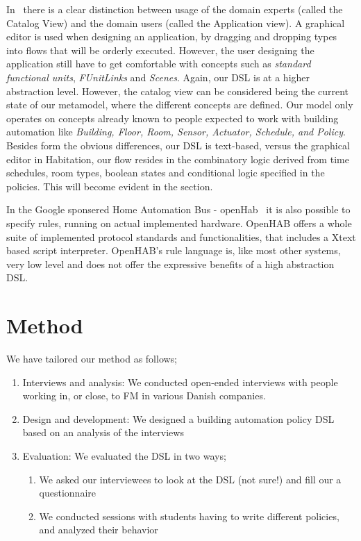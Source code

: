 \documentclass{llncs}
\begin{document}
In~\cite{habitation} there is a clear distinction between usage of the domain experts (called the Catalog View) and the domain users (called the Application view). A graphical editor is used when designing an application, by dragging and dropping types into flows that will be orderly executed. However, the user designing the application still have to get comfortable with concepts such as \textit{standard functional units}, \textit{FUnitLinks} and \textit{Scenes}. Again, our DSL is at a higher abstraction level. However, the catalog view can be considered being the current state of our metamodel, where the different concepts are defined. Our model only operates on concepts already known to people expected to work with building automation like \textit{Building, Floor, Room, Sensor, Actuator, Schedule, and Policy}. Besides form the obvious differences, our DSL is text-based, versus the graphical editor in Habitation, our flow resides in the combinatory logic derived from time schedules, room types, boolean states and conditional logic specified in the policies. This will become evident in the  section.

In the Google sponsered Home Automation Bus - openHab~\cite{openhab} it is also possible to specify rules, running on actual implemented hardware. OpenHAB offers a whole suite of implemented protocol standards and functionalities, that includes a Xtext based script interpreter. OpenHAB's rule language is, like most other systems, very low level and does not offer the expressive benefits of a high abstraction DSL.

\section{Method}\label{sec:method}
We have tailored our method as follows;

\begin{enumerate}
	\item Interviews and analysis: We conducted open-ended interviews with people working in, or close, to FM in various Danish companies.
	\item Design and development: We designed a building automation policy DSL based on an analysis of the interviews
	\item Evaluation: We evaluated the DSL in two ways;
	\begin{enumerate}
		\item We asked our interviewees to look at the DSL (not sure!) and fill our a questionnaire
		\item We conducted sessions with students having to write different policies, and analyzed their behavior
	\end{enumerate}
\end{enumerate}
\end{document}

